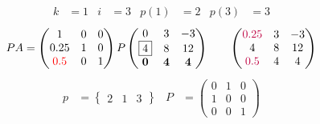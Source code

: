 \documentclass[pdf]{beamer}
\begin{document}
\begin{frame}{}\begin{align*} k &= 1 & i &= 3 & p(1) &= 2 & p(3) &= 3\end{align*}$$PA=\begin{pmatrix}1&0&0\\0.25&1&0\\{\color{red}0.5}&0&1\end{pmatrix} P \begin{pmatrix}0&3&-3\\\boxed{4}&8&12\\\mathbf{0}&\mathbf{4}&\mathbf{4}\end{pmatrix} \quad\quad \begin{pmatrix}{\color{purple}0.25}&3&-3\\4&8&12\\{\color{purple}0.5}&4&4\end{pmatrix}$$\begin{align*} p&= \begin{Bmatrix}2&1&3\end{Bmatrix} & P&= \begin{pmatrix}0&1&0\\1&0&0\\0&0&1\end{pmatrix} \end{align*}\end{frame}
\end{document}
